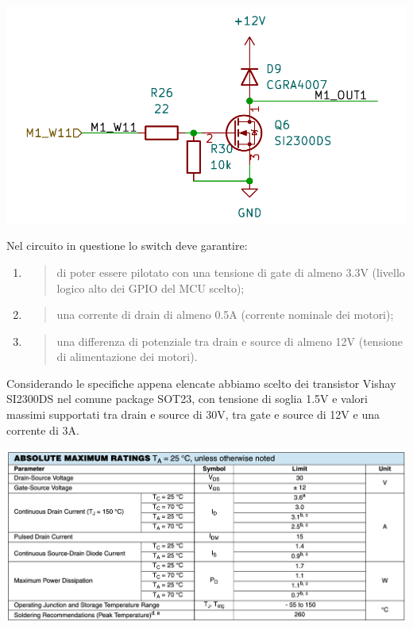 \begin{center}
\includegraphics[scale=0.5]{figures/image63.png}
\captionsetup{type=figure}
\end{center}

\noindent Nel circuito in questione lo switch deve garantire:

\begin{enumerate}
\def\labelenumi{\arabic{enumi}.}
\item
  \begin{quote}
  di poter essere pilotato con una tensione di gate di almeno 3.3V
  (livello logico alto dei GPIO del MCU scelto);
  \end{quote}
\item
  \begin{quote}
  una corrente di drain di almeno 0.5A (corrente nominale dei motori);
  \end{quote}
\item
  \begin{quote}
  una differenza di potenziale tra drain e source di almeno 12V
  (tensione di alimentazione dei motori).
  \end{quote}
\end{enumerate}

\noindent Considerando le specifiche appena elencate abbiamo scelto dei transistor
Vishay SI2300DS nel comune package SOT23, con tensione di soglia 1.5V e
valori massimi supportati tra drain e source di 30V, tra gate e source
di 12V e una corrente di 3A.

\begin{center}
\includegraphics[scale=0.5]{figures/image69.png}
\captionsetup{type=figure}
\end{center}

